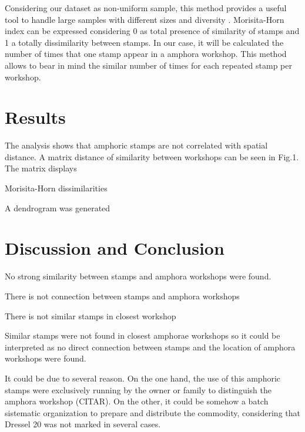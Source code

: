 \documentclass[review]{elsarticle}
\begin{document}
Considering our dataset as non-uniform sample, this method provides a useful tool to handle large samples with different sizes and diversity \citep{wolda_similarity_1981}. Morisita-Horn index can be expressed considering 0 as total presence of similarity of stamps and 1 a totally dissimilarity between stamps. In our case, it will be calculated the number of times that one stamp appear in a amphora workshop. This method allows to bear in mind the similar number of times for each repeated stamp per workshop. 


\section{Results}

The analysis shows that amphoric stamps are not correlated with spatial distance. A matrix distance of similarity between workshops can be seen in Fig.1. The matrix displays

Morisita-Horn dissimilarities

A dendrogram was generated 




\section{Discussion and Conclusion}

No strong similarity between stamps and amphora workshops were found. 

There is not connection between stamps and amphora workshops

There is not similar stamps in closest workshop 

Similar stamps were not found in closest amphorae workshops so it could be interpreted as no direct connection between stamps and the location of amphora workshops were found. 

It could be due to several reason. On the one hand, the use of this amphoric stamps were exclusively running by the owner or family to distinguish the amphora workshop (CITAR). On the other, it could be somehow a batch sistematic organization to prepare and distribute the commodity, considering that Dressel 20 was not marked in several cases. 
\end{document}
